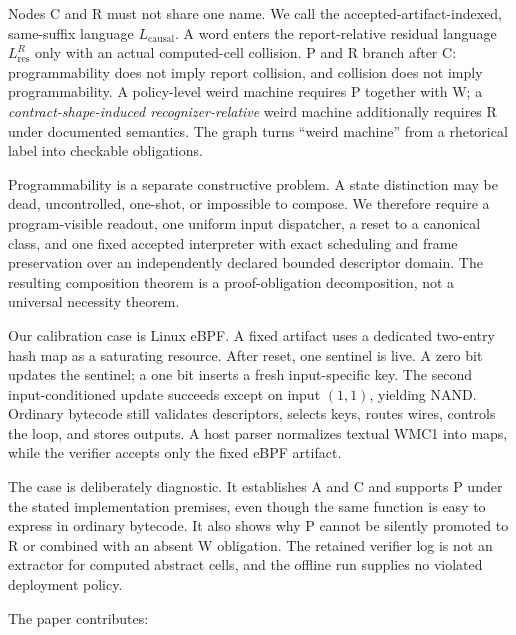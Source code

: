 \documentclass[conference]{IEEEtran}
\begin{document}
Nodes C and R must not share one name. We call the accepted-artifact-indexed, same-suffix language $L_{\mathrm{causal}}$. A word enters the report-relative residual language $L_{\mathrm{res}}^R$ only with an actual computed-cell collision. P and R branch after C: programmability does not imply report collision, and collision does not imply programmability. A policy-level weird machine requires P together with W; a \emph{contract-shape-induced recognizer-relative} weird machine additionally requires R under documented semantics. The graph turns ``weird machine'' from a rhetorical label into checkable obligations.

Programmability is a separate constructive problem. A state distinction may be dead, uncontrolled, one-shot, or impossible to compose. We therefore require a program-visible readout, one uniform input dispatcher, a reset to a canonical class, and one fixed accepted interpreter with exact scheduling and frame preservation over an independently declared bounded descriptor domain. The resulting composition theorem is a proof-obligation decomposition, not a universal necessity theorem.

Our calibration case is Linux eBPF. A fixed artifact uses a dedicated two-entry hash map as a saturating resource. After reset, one sentinel is live. A zero bit updates the sentinel; a one bit inserts a fresh input-specific key. The second input-conditioned update succeeds except on input $(1,1)$, yielding NAND. Ordinary bytecode still validates descriptors, selects keys, routes wires, controls the loop, and stores outputs. A host parser normalizes textual WMC1 into maps, while the verifier accepts only the fixed eBPF artifact.

The case is deliberately diagnostic. It establishes A and C and supports P under the stated implementation premises, even though the same function is easy to express in ordinary bytecode. It also shows why P cannot be silently promoted to R or combined with an absent W obligation. The retained verifier log is not an extractor for computed abstract cells, and the offline run supplies no violated deployment policy.

The paper contributes:
\end{document}
